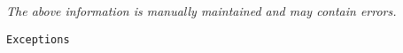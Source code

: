 \label{pkg:exceptions}

{\tiny \it The above information is manually maintained and may contain errors.}
\begin{verbatim}
Exceptions
\end{verbatim}
